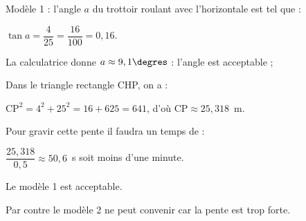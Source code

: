 \documentclass[10pt]{article}
\begin{document}

Modèle 1 : l’angle $a$ du trottoir roulant avec l’horizontale est tel que :

$\tan a = \dfrac{4}{25} = \dfrac{16}{100} = 0,16$.

La calculatrice donne $a \approx 9,1\degres$ : l’angle est acceptable ;

Dans le triangle rectangle CHP, on a :

$\text{CP}^2 = 4^2 + 25^2 = 16 + 625 = 641$, d’où $\text{CP} \approx 25,318$~m.

Pour gravir cette pente il faudra un temps de :

$\dfrac{25,318}{0,5}  \approx 50,6$~s soit moins d’une minute. 

Le modèle 1 est acceptable.

Par contre le modèle 2 ne peut convenir car la pente est trop forte.
\end{document}
